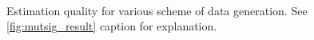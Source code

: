\begin{figure}[]\ContinuedFloat
  \centering
  \\
  \caption{Estimation quality for various scheme of data generation. See \cref{fig:mutsig_result} caption for explanation.}
  \label{fig:mutsig_result_appendix_2}
\end{figure}

